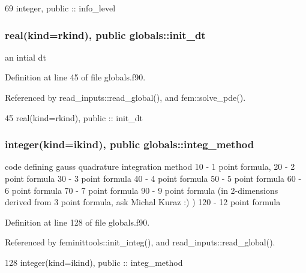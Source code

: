 \begin{DoxyCode}
69   \textcolor{keywordtype}{integer}, \textcolor{keywordtype}{public} :: info_level
\end{DoxyCode}
\subsubsection[{init\+\_\+dt}]{\setlength{\rightskip}{0pt plus 5cm}real(kind=rkind), public globals\+::init\+\_\+dt}\label{namespaceglobals_a4c3a5850893cc47448134de52206d94b}


an intial dt 



Definition at line 45 of file globals.\+f90.



Referenced by read\+\_\+inputs\+::read\+\_\+global(), and fem\+::solve\+\_\+pde().


\begin{DoxyCode}
45   \textcolor{keywordtype}{real(kind=rkind)}, \textcolor{keywordtype}{public} :: init_dt
\end{DoxyCode}
\subsubsection[{integ\+\_\+method}]{\setlength{\rightskip}{0pt plus 5cm}integer(kind=ikind), public globals\+::integ\+\_\+method}\label{namespaceglobals_a9de75cbf3826403f05a61d7aaea842d2}


code defining gauss quadrature integration method 10 -\/ 1 point formula, 20 -\/ 2 point formula 30 -\/ 3 point formula 40 -\/ 4 point formula 50 -\/ 5 point formula 60 -\/ 6 point formula 70 -\/ 7 point formula 90 -\/ 9 point formula (in 2-\/dimensions derived from 3 point formula, ask Michal Kuraz \+:) ) 120 -\/ 12 point formula 



Definition at line 128 of file globals.\+f90.



Referenced by feminittools\+::init\+\_\+integ(), and read\+\_\+inputs\+::read\+\_\+global().


\begin{DoxyCode}
128   \textcolor{keywordtype}{integer(kind=ikind)}, \textcolor{keywordtype}{public} :: integ_method
\end{DoxyCode}
